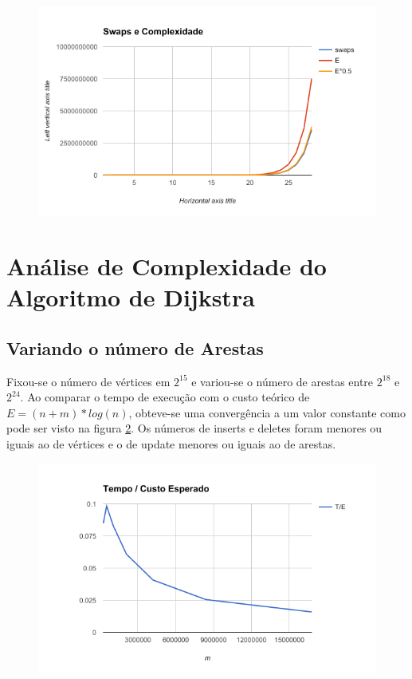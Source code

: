 \documentclass{iiufrgs}
\begin{document}
\begin{figure}[H]
\includegraphics[width=0.75\linewidth]{delete1}
\centering
\caption{}{}
\label{fig:delete2}
\end{figure}

\section{Análise de Complexidade do Algoritmo de Dijkstra}
\subsection{Variando o número de Arestas}
Fixou-se o número de vértices em $2^{15}$ e variou-se o número de arestas entre $2^{18}$ e $2^{24}$. Ao comparar o tempo de execuç\~ao com o custo teórico de $E = (n+m)*log(n)$, obteve-se uma convergência a um valor constante como pode ser visto na figura \ref{fig:dij_vertex}. Os números de inserts e deletes foram menores ou iguais ao de vértices e o de update menores ou iguais ao de arestas.
\begin{figure}[h!]
\includegraphics[width=0.75\linewidth]{dijkstra_fixedvertex}
\centering
\caption{}{}
\label{fig:dij_vertex}
\end{figure}
\end{document}
